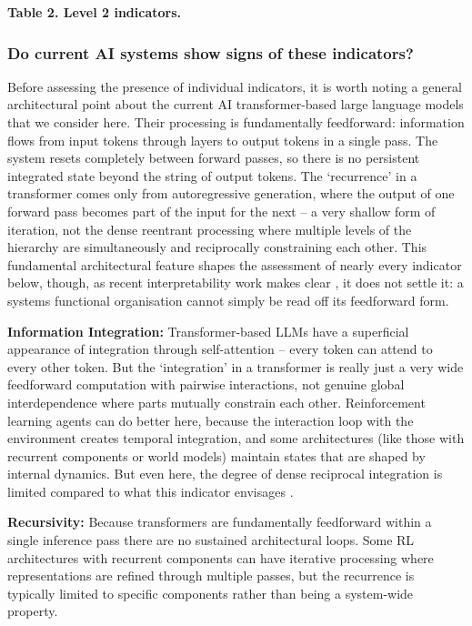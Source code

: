 \documentclass[11pt, a4paper, onecolumn, gdm]{google}
\begin{document}
\textbf{Table 2. Level 2 indicators.}

\subsubsection*{Do current AI systems show signs of these indicators?}\label{do-current-ai-systems-show-signs-of-these-indicators}

Before assessing the presence of individual indicators, it is worth noting a general architectural point about the current AI transformer-based large language models that we consider here.
Their processing is fundamentally feedforward: information flows from input tokens through layers to output tokens in a single pass.
The system resets completely between forward passes, so there is no persistent integrated state beyond the string of output tokens.
The `recurrence' in a transformer comes only from autoregressive generation, where the output of one forward pass becomes part of the input for the next -- a very shallow form of iteration, not the dense reentrant processing where multiple levels of the hierarchy are simultaneously and reciprocally constraining each other.
This fundamental architectural feature shapes the assessment of nearly every indicator below, though, as recent interpretability work makes clear \citep{gurnee2026}, it does not settle it: a system\textquotesingle s functional organisation cannot simply be read off its feedforward form.

\textbf{Information Integration:} Transformer-based LLMs have a superficial appearance of integration through self-attention -- every token can attend to every other token.
But the `integration' in a transformer is really just a very wide feedforward computation with pairwise interactions, not genuine global interdependence where parts mutually constrain each other.
Reinforcement learning agents can do better here, because the interaction loop with the environment creates temporal integration, and some architectures (like those with recurrent components or world models) maintain states that are shaped by internal dynamics.
But even here, the degree of dense reciprocal integration is limited compared to what this indicator envisages \citep{li2025}.

\textbf{Recursivity:} Because transformers are fundamentally feedforward within a single inference pass there are no sustained architectural loops.
Some RL architectures with recurrent components can have iterative processing where representations are refined through multiple passes, but the recurrence is typically limited to specific components rather than being a system-wide property.
\end{document}
